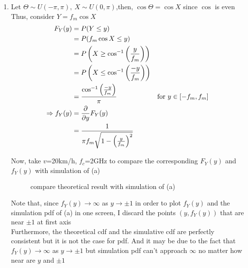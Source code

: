 \documentclass{article}
\begin{document}
\begin{flushleft}
\begin{enumerate}[label=(\alph*)]
\item
Let $\Theta\sim U(-\pi,\pi),\  X\sim U(0,\pi)$,then, $\cos\Theta=\cos X$ since $\cos$ is even
Thus, consider $Y=f_m\cos X$\\
\begin{align}
F_Y(y)&=P(Y\leq y)\notag\\
&=P(f_m\cos X\leq y)\notag\\
&=P\left(X\geq \cos^{-1}\left(\frac{y}{f_m}\right)\right)\notag\\
&=P\left(X\leq \cos^{-1}\left(\frac{-y}{f_m}\right)\right)\notag\\
&=\frac{\cos^{-1}\left(\frac{-y}{f_m}\right)}{\pi}&{\rm for}\ y\in[-f_m,f_m] \notag\\
\Rightarrow f_Y(y)&=\frac{\partial}{\partial y}F_Y(y)\notag\\
&=\frac{1}{\pi f_m\sqrt{1-\left(\frac{y}{f_m}\right)^2}}\notag
\end{align}

\newpage

Now, take $v$=20km/h, $f_c$=2GHz to compare the corresponding $F_Y(y)$ and $ f_Y(y)$ with simulation of (a)
\begin{figure}[H]
\centering
{}
\caption{compare theoretical result with simulation of (a)}
\end{figure}
Note that, since $f_Y(y)\rightarrow \infty $ as $y\rightarrow \pm 1$  in order to plot $f_Y(y)$ and the simulation pdf of (a) in one screen, I discard the points $(y,f_Y(y))$ that are near $\pm 1$ at first axis \\
Furthermore, the theoretical cdf and the simulative cdf are perfectly consistent but it is not the case for pdf. And it may be due to the fact that  $f_Y(y)\rightarrow \infty $ as $y\rightarrow \pm 1$ but simulation pdf can't approach  $ \infty$ no matter how near are $y$ and $\pm 1$ 



\end{enumerate}
\end{flushleft}
\end{document}
